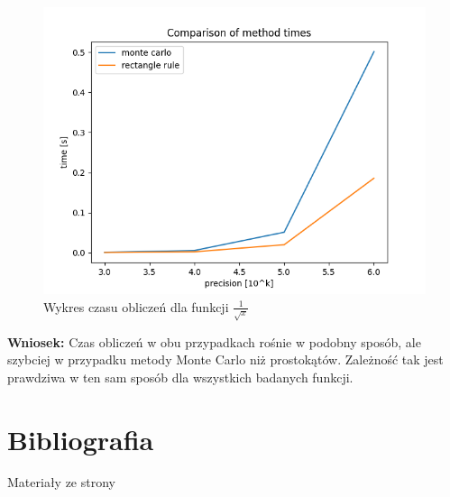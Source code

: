 \documentclass{article}
\begin{document}
\begin{figure}[H]
    \centering
    \includegraphics[width=0.85\linewidth]{plots/plot3.png}
    \caption{Wykres czasu obliczeń dla funkcji \(\frac{1}{\sqrt{x}}\)}
    \label{fig:plot3}
\end{figure}

\noindent
\textbf{Wniosek:} Czas obliczeń w obu przypadkach rośnie w podobny sposób, ale szybciej w przypadku metody Monte Carlo niż prostokątów. Zależność tak jest prawdziwa w ten sam sposób dla wszystkich badanych funkcji.

\section{Bibliografia}
Materiały ze strony
\end{document}

